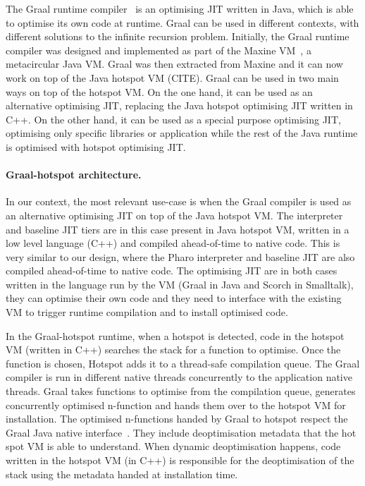 \documentclass[a4paper,12pt,twoside]{../includes/ThesisStyle}
\begin{document}
The Graal runtime compiler~\cite{Oracle13,Dubo13c} is an optimising JIT written in Java, which is able to optimise its own code at runtime. Graal can be used in different contexts, with different solutions to the infinite recursion problem. Initially, the Graal runtime compiler was designed and implemented as part of the Maxine VM~\cite{Wimm13a}, a metacircular Java VM. Graal was then extracted from Maxine and it can now work on top of the Java hotspot VM (CITE). Graal can be used in two main ways on top of the hotspot VM. On the one hand, it can be used as an alternative optimising JIT, replacing the Java hotspot optimising JIT written in C++. On the other hand, it can be used as a special purpose optimising JIT, optimising only specific libraries or application while the rest of the Java runtime is optimised with hotspot optimising JIT. %

\paragraph{Graal-hotspot architecture.} In our context, the most relevant use-case is when the Graal compiler is used as an alternative optimising JIT on top of the Java hotspot VM. The interpreter and baseline JIT tiers are in this case present in Java hotspot VM, written in a low level language (C++) and compiled ahead-of-time to native code. This is very similar to our design, where the Pharo interpreter and baseline JIT are also compiled ahead-of-time to native code. The optimising JIT are in both cases written in the language run by the VM (Graal in Java and Scorch in Smalltalk), they can optimise their own code and they need to interface with the existing VM to trigger runtime compilation and to install optimised code.

In the Graal-hotspot runtime, when a hotspot is detected, code in the hotspot VM (written in C++) searches the stack for a function to optimise. Once the function is chosen, Hotspot adds it to a thread-safe compilation queue. The Graal compiler is run in different native threads concurrently to the application native threads. Graal takes functions to optimise from the compilation queue, generates concurrently optimised n-function and hands them over to the hotspot VM for installation. The optimised n-functions handed by Graal to hotspot respect the Graal Java native interface~\cite{Grim13a}. They include deoptimisation metadata that the hot spot VM is able to understand. When dynamic deoptimisation happens, code written in the hotspot VM (in C++) is responsible for the deoptimisation of the stack using the metadata handed at installation time.
\end{document}
